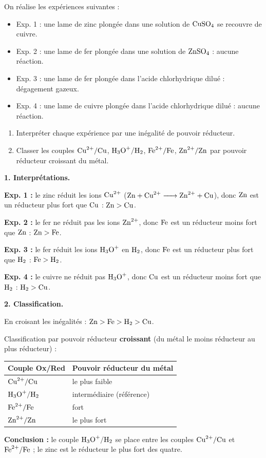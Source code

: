 \documentclass[11pt]{article}
\begin{document}
\begin{exoresolu}
On réalise les expériences suivantes :
\begin{itemize}
\item Exp. 1 : une lame de zinc plongée dans une solution de $\ce{CuSO4}$ se recouvre de cuivre.
\item Exp. 2 : une lame de fer plongée dans une solution de $\ce{ZnSO4}$ : aucune réaction.
\item Exp. 3 : une lame de fer plongée dans l'acide chlorhydrique dilué : dégagement gazeux.
\item Exp. 4 : une lame de cuivre plongée dans l'acide chlorhydrique dilué : aucune réaction.
\end{itemize}
\begin{enumerate}
\item Interpréter chaque expérience par une inégalité de pouvoir réducteur.
\item Classer les couples $\ce{Cu^2+}/\ce{Cu}$, $\ce{H3O+}/\ce{H2}$, $\ce{Fe^2+}/\ce{Fe}$, $\ce{Zn^2+}/\ce{Zn}$ par pouvoir réducteur croissant du métal.
\end{enumerate}
\tcblower
\textbf{1. Interprétations.}

\textbf{Exp. 1 :} le zinc réduit les ions $\ce{Cu^2+}$ ($\ce{Zn + Cu^2+ -> Zn^2+ + Cu}$), donc $\ce{Zn}$ est un réducteur plus fort que $\ce{Cu}$ : $\ce{Zn} > \ce{Cu}$.

\textbf{Exp. 2 :} le fer ne réduit pas les ions $\ce{Zn^2+}$, donc $\ce{Fe}$ est un réducteur moins fort que $\ce{Zn}$ : $\ce{Zn} > \ce{Fe}$.

\textbf{Exp. 3 :} le fer réduit les ions $\ce{H3O+}$ en $\ce{H2}$, donc $\ce{Fe}$ est un réducteur plus fort que $\ce{H2}$ : $\ce{Fe} > \ce{H2}$.

\textbf{Exp. 4 :} le cuivre ne réduit pas $\ce{H3O+}$, donc $\ce{Cu}$ est un réducteur moins fort que $\ce{H2}$ : $\ce{H2} > \ce{Cu}$.

\textbf{2. Classification.}

En croisant les inégalités : $\ce{Zn} > \ce{Fe} > \ce{H2} > \ce{Cu}$.

Classification par pouvoir réducteur \textbf{croissant} (du métal le moins réducteur au plus réducteur) :
\begin{center}
\begin{tabularx}{0,9\linewidth}{|X|X|}
\hline
\rowcolor{popblueL} Couple Ox/Red & Pouvoir réducteur du métal \\
\hline
$\ce{Cu^2+}/\ce{Cu}$ & le plus faible \\
\hline
$\ce{H3O+}/\ce{H2}$ & intermédiaire (référence) \\
\hline
$\ce{Fe^2+}/\ce{Fe}$ & fort \\
\hline
$\ce{Zn^2+}/\ce{Zn}$ & le plus fort \\
\hline
\end{tabularx}
\end{center}

\textbf{Conclusion :} le couple $\ce{H3O+}/\ce{H2}$ se place entre les couples $\ce{Cu^2+}/\ce{Cu}$ et $\ce{Fe^2+}/\ce{Fe}$ ; le zinc est le réducteur le plus fort des quatre.
\end{exoresolu}
\end{document}
